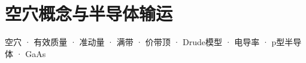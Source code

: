 
\section{空穴概念与半导体输运}
\label{sec:hole-concept-and-transport}

\begin{tipbox}[关键词标签]
空穴 · 有效质量 · 准动量 · 满带 · 价带顶 · Drude模型 · 电导率 · p型半导体 · GaAs
\end{tipbox}

